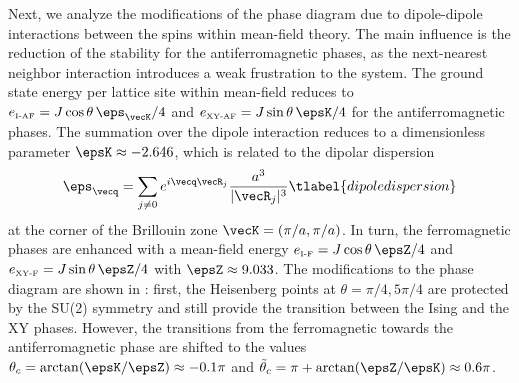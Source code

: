 Next, we analyze the modifications of the phase diagram due to dipole-dipole
interactions between the spins within mean-field theory. The
main influence is the reduction of the stability for the antiferromagnetic
phases, as the next-nearest neighbor interaction introduces a weak frustration
to the system. The ground state energy per lattice site within mean-field
reduces to $ e_{\mbox{\tiny I-AF}} = J \cos \theta \, \eps_\vecK/4$ and $e_{\mbox{\tiny XY-AF}} = J \sin \theta \, \epsK/4$
for the antiferromagnetic phases. The summation over the dipole interaction
reduces to a dimensionless parameter $\epsK \approx -2.646$, which is related to
the dipolar dispersion~\cite{Peter2012b,Peter2014,Muller2010,Syzranov2014}
%
\begin{align}
    \eps_\vecq = \sum_{j \neq 0} e^{i \vecq \vecR_j }\frac{a^3}{|\vecR_j|^3}
  \tlabel{dipoledispersion}
\end{align}
%
at the corner of the Brillouin zone $\vecK = (\pi/a, \pi /a)$.
In turn, the ferromagnetic phases are enhanced with a mean-field energy
$e_{\mbox{\tiny I-F}} = J \cos \theta \, \epsZ/4 $ and $ e_{\mbox{\tiny XY-F}} = J \sin \theta \, \epsZ/4$
with $\epsZ \approx 9.033$. The modifications to the
phase diagram are shown in : first, the Heisenberg points at
$\theta = \pi/4, 5 \pi/4$ are protected by the SU(2) symmetry and still
provide the transition between the Ising and the XY phases. However, the
transitions from the ferromagnetic towards the antiferromagnetic phase are
shifted to the values $\theta_{c}= \arctan(\epsK/\epsZ)
\approx -0.1 \pi$ and $\tilde{\theta}_c = \pi+ \arctan(\epsZ/\epsK)\approx 0.6 \pi$.



